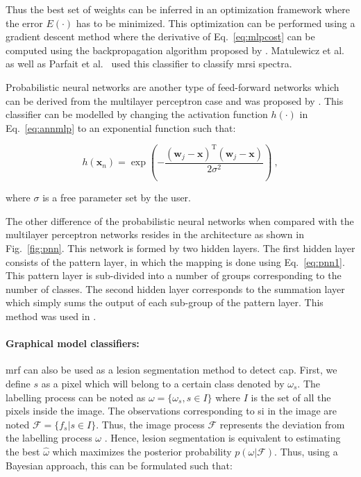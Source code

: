 Thus the best set of weights can be inferred in an optimization framework where the error $E(\cdot)$ has to be minimized.
This optimization can be performed using a gradient descent method where the derivative of Eq.~\eqref{eq:mlpcost} can be computed using the backpropagation algorithm proposed by \cite{Rumelhart1988}. 
Matulewicz et al.~\cite{Matulewicz2013} as well as Parfait et al.~\cite{Parfait2012} used this classifier to classify \ac{mrsi} spectra.



Probabilistic neural networks are another type of feed-forward networks which can be derived from the multilayer perceptron case and was proposed by \cite{Specht1988}.
This classifier can be modelled by changing the activation function $h(\cdot)$ in Eq.~\eqref{eq:annmlp} to an exponential function such that:

\begin{equation}
	h(\mathbf{x}_n) = \exp \left( - \frac{ (\mathbf{w}_j - \mathbf{x})^{\text{T}}(\mathbf{w}_j - \mathbf{x}) }{2\sigma^2} \right) \ ,
	\label{eq:pnn1}
\end{equation}

\noindent where $\sigma$ is a free parameter set by the user.

The other difference of the probabilistic neural networks when compared with the multilayer perceptron networks resides in the architecture as shown in Fig.~\ref{fig:pnn}.
This network is formed by two hidden layers.
The first hidden layer consists of the pattern layer, in which the mapping is done using Eq.~\eqref{eq:pnn1}.
This pattern layer is sub-divided into a number of groups corresponding to the number of classes.
The second hidden layer corresponds to the summation layer which simply sums the output of each sub-group of the pattern layer.
This method was used in \cite{Ampeliotis2007,Ampeliotis2008,Viswanath2011}.

\paragraph{Graphical model classifiers:}
\Ac{mrf} can also be used as a lesion segmentation method to detect \ac{cap}.
First, we define $s$ as a pixel which will belong to a certain class denoted by $\omega_s$.
The labelling process can be noted as $\omega = \{\omega_s, s \in I\}$ where $I$ is the set of all the pixels inside the image.
The observations corresponding to \ac{si} in the image are noted $\mathcal{F} = \{ f_s | s \in I \}$.
Thus, the image process $\mathcal{F}$ represents the deviation from the labelling process $\omega$ \cite{Kato2001}.
Hence, lesion segmentation is equivalent to estimating the best $\hat{\omega}$ which maximizes the posterior probability $p(\omega|\mathcal{F})$.
Thus, using a Bayesian approach, this can be formulated such that:

